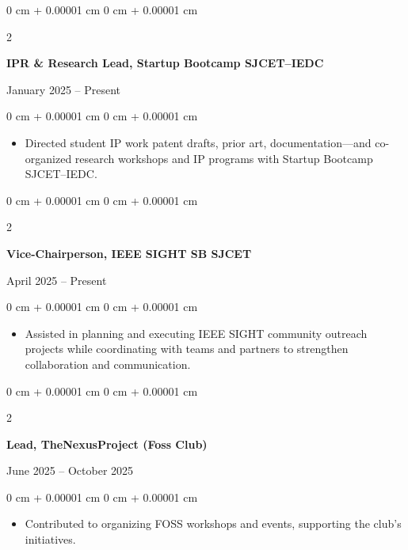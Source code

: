 \documentclass[10pt, a4paper]{article}
\newenvironment{highlights}{
    \begin{itemize}[
        topsep=0.10 cm,
        parsep=0.10 cm,
        partopsep=0pt,
        itemsep=0pt,
        leftmargin=0 cm + 10pt
    ]
}{
    \end{itemize}
} %
\newenvironment{onecolentry}{
    \begin{adjustwidth}{
        0 cm + 0.00001 cm
    }{
        0 cm + 0.00001 cm
    }
}{
    \end{adjustwidth}
} %
\newenvironment{twocolentry}[2][]{
    \onecolentry
    \def\secondColumn{#2}
    \setcolumnwidth{\fill, 4.5 cm}
    \begin{paracol}{2}
}{
    \switchcolumn \raggedleft \secondColumn
    \end{paracol}
    \endonecolentry
} %
\begin{document}
\vspace{0.2 cm}

\begin{twocolentry}{
    January 2025 – Present
}
    \textbf{IPR \& Research Lead, Startup Bootcamp SJCET–IEDC}
\end{twocolentry}

\vspace{0.10 cm}
\begin{onecolentry}
    \begin{highlights}
        \item Directed student IP work patent drafts, prior art, documentation—and co-organized research workshops and IP programs with Startup Bootcamp SJCET–IEDC.
    \end{highlights}
\end{onecolentry}

\vspace{0.2 cm}

\begin{twocolentry}{
    April 2025 – Present
}
    \textbf{Vice-Chairperson, IEEE SIGHT SB SJCET}
\end{twocolentry}

\vspace{0.10 cm}
\begin{onecolentry}
    \begin{highlights}
        \item Assisted in planning and executing IEEE SIGHT community outreach projects while coordinating with teams and partners to strengthen collaboration and communication.
    \end{highlights}
\end{onecolentry}

\vspace{0.2 cm}

\begin{twocolentry}{
    June 2025 – October 2025
}
    \textbf{Lead, TheNexusProject (Foss Club)}
\end{twocolentry}

\vspace{0.10 cm}
\begin{onecolentry}
    \begin{highlights}
        \item Contributed to organizing FOSS workshops and events, supporting the club's initiatives.
    \end{highlights}
\end{onecolentry}
\end{document}
